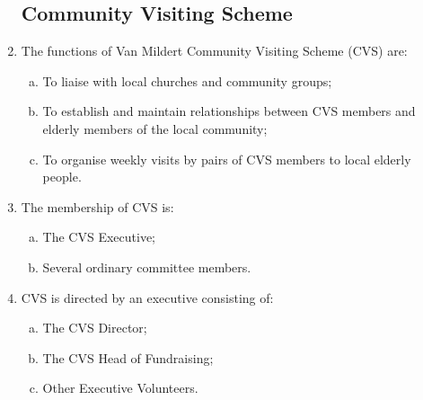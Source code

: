 \documentclass[12pt]{article}
\begin{document}
\begin{enumerate}
    \subsection{Community Visiting Scheme}
    \item The functions of Van Mildert Community Visiting Scheme (CVS) are:
    \begin{enumerate}[(a)]
        \item To liaise with local churches and community groups;
        \item To establish and maintain relationships between CVS members and elderly members of the local community;
        \item To organise weekly visits by pairs of CVS members to local elderly people.
    \end{enumerate}
    \item   The membership of CVS is:
    \begin{enumerate}[(a)]
    \item The CVS Executive;
    \item Several ordinary committee members.
    \end{enumerate}
	   \item  CVS is directed by an executive consisting of:
        \begin{enumerate}[(a)]
    \item The CVS Director;
    \item The CVS Head of Fundraising;
    \item Other Executive Volunteers.
    \end{enumerate}
    

\end{enumerate}
\end{document}
